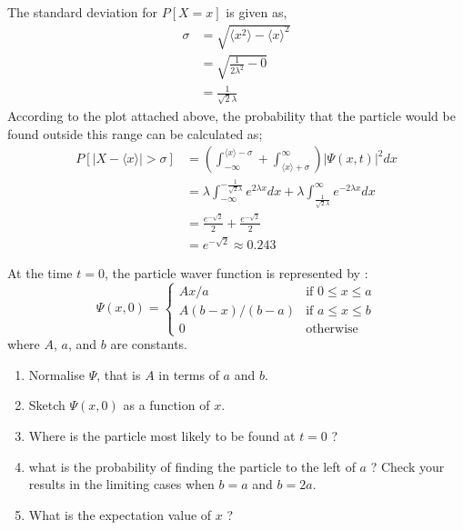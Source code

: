 \documentclass[addpoints]{exam}
\begin{document}
\begin{questions}
\begin{solution}
        The standard deviation for $P[X=x]$ is given as,
        \begin{align*}
            \sigma & = \sqrt{\langle x^2 \rangle - {\langle x \rangle}^2} \\
                   & = \sqrt{\frac{1}{2\lambda ^2} - 0}                   \\
                   & = \frac{1}{\sqrt{2}\lambda}
        \end{align*}
        \noindent  According to the plot attached above, the probability that the particle would be found outside this range can be calculated as;
        \begin{align*}
            P[|X - \langle x \rangle| > \sigma] & =  \left(\int_{-\infty}^{\langle x \rangle - \sigma} + \int_{\langle x \rangle + \sigma}^{\infty}\right) {|\Psi(x,t)|^2} dx                        \\
                                                & = \lambda \int_{-\infty}^{-\frac{1}{\sqrt{2}\lambda}} {e^{2\lambda x}} dx + \lambda \int_{\frac{1}{\sqrt{2}\lambda}}^{\infty} {e^{-2\lambda x}} dx \\
                                                & = \frac{e^{-\sqrt{2}}}{2} + \frac{e^{-\sqrt{2}}}{2}                                                                                                \\
                                                & = e^{-\sqrt{2}} \approx 0.243
        \end{align*}

    \end{solution}
    \pagebreak
    \question[15] At the time $t = 0$, the particle waver function is represented by :
    \[\Psi(x,0)=\begin{cases}
            Ax/a         & \text{if } 0 \leq x \leq a \\
            A(b-x)/(b-a) & \text{if } a \leq x \leq b \\
            0            & \text{otherwise}
        \end{cases}\]
    where $A$, $a$, and $b$ are constants.
    \begin{enumerate}
        \item Normalise $\Psi$, that is $A$ in terms of $a$ and $b$.
        \item Sketch $\Psi(x, 0)$ as a function of $x$.
        \item Where is the particle most likely to be found at $t = 0$ ?
        \item what is the probability of finding the particle to the left of $a$ ? Check your results in the limiting cases when $b = a$ and $b = 2a$.
        \item What is the expectation value of $x$ ?
    \end{enumerate}


\end{questions}
\end{document}
